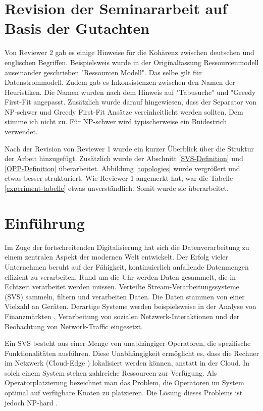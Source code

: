 \documentclass{article}
\begin{document}
\section{Revision der Seminararbeit auf Basis der Gutachten}
Von Reviewer 2 gab es einige Hinweise für die Kohärenz zwischen deutschen und englischen Begriffen. 
Beispielsweis wurde in der Originalfassung Ressourcenmodell auseinander geschrieben  "Ressourcen Modell". 
Das selbe gilt für Datenstrommodell.
Zudem gab es Inkonsistenzen zwischen den Namen der Heuristiken. Die Namen wurden nach dem Hinweis auf "Tabusuche" und "Greedy First-Fit angepasst.
Zusätzlich wurde darauf hingewiesen, dass der Separator von NP-schwer und Greedy First-Fit Ansätze 
vereinheitlicht werden sollten. Dem stimme ich nicht zu. Für NP-schwer wird typischerweise ein Bnidestrich verwendet. 

Nach der Revision von Reviewer 1 wurde ein kurzer Überblick über die Struktur der Arbeit hinzugefügt. Zusätzlich wurde der Abschnitt \ref{SVS-Definition} und \ref{OPP-Definition} überarbeitet. 
Abbildung \ref{topologies} wurde vergrößert und etwas besser strukturiert. Wie Reviewer 1 angemerkt hat, war die Tabelle \ref{experiment-tabelle} etwas unverständlich. Somit wurde sie überarbeitet. 




\section{Einführung}
Im Zuge der fortschreitenden Digitalisierung hat sich die Datenverarbeitung zu einem zentralen Aspekt der modernen Welt entwickelt.
Der Erfolg vieler Unternehmen beruht auf der Fähigkeit, kontinuierlich anfallende Datenmengen effizient zu verarbeiten.
Rund um die Uhr werden Daten gesammelt, die in Echtzeit verarbeitet werden müssen. 
Verteilte Stream-Verarbeitungssysteme (SVS) sammeln, filtern und verarbeiten Daten. Die Daten stammen von einer Vielzahl an Geräten.
Derartige Systeme werden beispielsweise in der Analyse von Finanzmärkten \cite{k5}, 
Verarbeitung von sozialen Netzwerk-Interaktionen und der Beobachtung von Network-Traffic \cite{k5} 
eingesetzt. 

Ein SVS besteht aus einer Menge von unabhängiger Operatoren, die spezifische
Funktionalitäten ausführen. Diese Unabhängigkeit ermöglicht es, dass die Rechner im Netzwerk (Cloud-Edge \cite{k6}) lokalisiert werden können, 
anstatt in der Cloud.
In solch einem System stehen zahlreiche Ressourcen zur Verfügung. 
Als Operatorplatzierung bezeichnet man das Problem, 
die Operatoren im System optimal auf verfügbare Knoten zu platzieren. 
Die Lösung dieses Problems ist jedoch NP-hard \cite{cardellini-optimal_operatorplc}.
\end{document}
